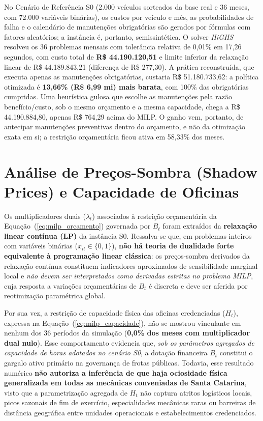 No Cenário de Referência S0 (2.000 veículos sorteados da base real e 36 meses, com 72.000 variáveis binárias), os custos por veículo e mês, as probabilidades de falha e o calendário de manutenções obrigatórias são gerados por fórmulas com fatores aleatórios; a instância é, portanto, semissintética. O solver \textit{HiGHS} resolveu os 36 problemas mensais com tolerância relativa de 0,01\% em 17,26 segundos, com custo total de \textbf{R\$ 44.190.120,51} e limite inferior da relaxação linear de R\$ 44.189.843,21 (diferença de R\$ 277,30). A prática reconstruída, que executa apenas as manutenções obrigatórias, custaria R\$ 51.180.733,62: a política otimizada é \textbf{13,66\% (R\$ 6,99 mi) mais barata}, com 100\% das obrigatórias cumpridas. Uma heurística gulosa que escolhe as manutenções pela razão benefício/custo, sob o mesmo orçamento e a mesma capacidade, chega a R\$ 44.190.884,80, apenas R\$ 764,29 acima do MILP. O ganho vem, portanto, de antecipar manutenções preventivas dentro do orçamento, e não da otimização exata em si; a restrição orçamentária ficou ativa em 58,33\% dos meses.
\section{Análise de Preços-Sombra (Shadow Prices) e Capacidade de Oficinas}

Os multiplicadores duais ($\lambda_t$) associados à restrição orçamentária da Equação~(\ref{eq:milp_orcamento}) governada por $B_t$ foram extraídos da \textbf{relaxação linear contínua (LP)} da instância S0. Ressalva-se que, em problemas inteiros com variáveis binárias ($x_{it} \in \{0, 1\}$), \textbf{não há teoria de dualidade forte equivalente à programação linear clássica}: os preços-sombra derivados da relaxação contínua constituem indicadores aproximados de sensibilidade marginal local e \textit{não devem ser interpretados como derivadas estritas no problema MILP}, cuja resposta a variações orçamentárias de $B_t$ é discreta e deve ser aferida por reotimização paramétrica global.

Por sua vez, a restrição de capacidade física das oficinas credenciadas ($H_t$), expressa na Equação~(\ref{eq:milp_capacidade}), não se mostrou vinculante em nenhum dos 36 períodos da simulação (\textbf{0,0\% dos meses com multiplicador dual nulo}). Esse comportamento evidencia que, \textit{sob os parâmetros agregados de capacidade de horas adotados no cenário S0}, a dotação financeira $B_t$ constitui o gargalo ativo primário na governança de frotas públicas. Todavia, esse resultado numérico \textbf{não autoriza a inferência de que haja ociosidade física generalizada em todas as mecânicas conveniadas de Santa Catarina}, visto que a parametrização agregada de $H_t$ não captura atritos logísticos locais, picos sazonais de fim de exercício, especialidades mecânicas raras ou barreiras de distância geográfica entre unidades operacionais e estabelecimentos credenciados.
